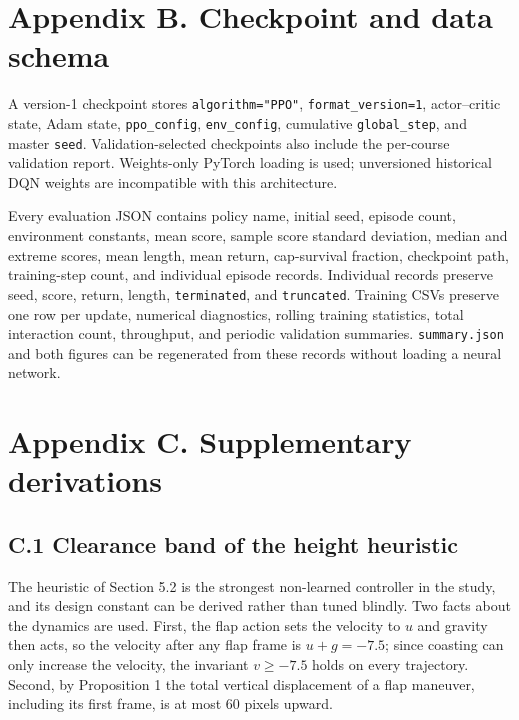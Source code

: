 \documentclass[
  11pt,
]{article}
\begin{document}
\section{Appendix B. Checkpoint and data
schema}\label{appendix-b.-checkpoint-and-data-schema}

A version-1 checkpoint stores \texttt{algorithm="PPO"},
\texttt{format\_version=1}, actor--critic state, Adam state,
\texttt{ppo\_config}, \texttt{env\_config}, cumulative
\texttt{global\_step}, and master \texttt{seed}. Validation-selected
checkpoints also include the per-course validation report. Weights-only
PyTorch loading is used; unversioned historical DQN weights are
incompatible with this architecture.

Every evaluation JSON contains policy name, initial seed, episode count,
environment constants, mean score, sample score standard deviation,
median and extreme scores, mean length, mean return, cap-survival
fraction, checkpoint path, training-step count, and individual episode
records. Individual records preserve seed, score, return, length,
\texttt{terminated}, and \texttt{truncated}. Training CSVs preserve one
row per update, numerical diagnostics, rolling training statistics,
total interaction count, throughput, and periodic validation summaries.
\texttt{summary.json} and both figures can be regenerated from these
records without loading a neural network.

\section{Appendix C. Supplementary
derivations}\label{appendix-c.-supplementary-derivations}

\subsection{C.1 Clearance band of the height
heuristic}\label{c.1-clearance-band-of-the-height-heuristic}

The heuristic of Section 5.2 is the strongest non-learned controller in
the study, and its design constant can be derived rather than tuned
blindly. Two facts about the dynamics are used. First, the flap action
sets the velocity to \(u\) and gravity then acts, so the velocity after
any flap frame is \(u+g=-7.5\); since coasting can only increase the
velocity, the invariant \(v\ge-7.5\) holds on every trajectory. Second,
by Proposition 1 the total vertical displacement of a flap maneuver,
including its first frame, is at most \(60\) pixels upward.
\end{document}

